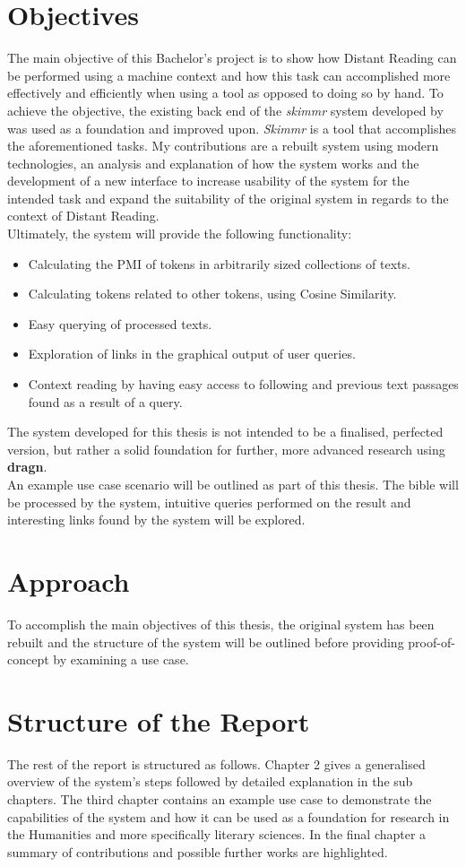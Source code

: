 \section{Objectives}
The main objective of this Bachelor's project is to show how Distant Reading can be performed using a machine context and how this task can accomplished more effectively and efficiently when using a tool as opposed to doing so by hand. To achieve the objective, the existing back end of the \textit{skimmr} system developed by \cite {novavcek2014skimmr} was used as a foundation and improved upon. \textit{Skimmr} is a tool that accomplishes the aforementioned tasks. My contributions are a rebuilt system using modern technologies, an analysis and explanation of how the system works and the development of a new interface to increase usability of the system for the intended task and expand the suitability of the original system in regards to the context of Distant Reading.\\
Ultimately, the system will provide the following functionality:
\begin{itemize}
\item Calculating the PMI of tokens in arbitrarily sized collections of texts.
\item Calculating tokens related to other tokens, using Cosine Similarity.
\item Easy querying of processed texts.
\item Exploration of links in the graphical output of user queries.
\item Context reading by having easy access to following and previous text passages found as a result of a query.
\end{itemize}
The system developed for this thesis is not intended to be a finalised, perfected version, but rather a solid foundation for further, more advanced research using \textbf{dragn}.\\
An example use case scenario will be outlined as part of this thesis. The bible will be processed by the system, intuitive queries performed on the result and interesting links found by the system will be explored.

\section{Approach}
To accomplish the main objectives of this thesis, the original system has been rebuilt and the structure of the system will be outlined before providing proof-of-concept by examining a use case.
\section{Structure of the Report}
The rest of the report is structured as follows. Chapter 2 gives a generalised overview of the system's steps followed by detailed explanation in the sub chapters. The third chapter contains an example use case to demonstrate the capabilities of the system and how it can be used as a foundation for research in the Humanities and more specifically literary sciences. In the final chapter a summary of contributions and possible further works are highlighted.